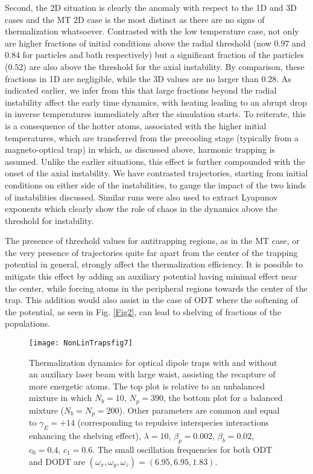 \documentclass[pra,letterpaper,onecolumn,superscriptaddress,floatfix]{revtex4}
\begin{document}
Second, the 2D situation is clearly the anomaly with respect to the 1D and 3D cases and the MT 2D case is 
the most distinct as there are no signs of thermalization whatsoever. Contrasted with the low temperature
case, not only are higher fractions of initial conditions above the radial threshold (now $0.97$ and $0.84$
for particles and bath respectively) but a significant fraction of the particles ($0.52$) are also above the
threshold for the axial instability. By comparison, these fractions in 1D are negligible, while the 3D values
are no larger than $0.28$. As indicated earlier, we infer from this that large fractions beyond the radial
instability affect the early time dynamics, with heating leading to an abrupt drop in inverse temperatures
immediately after the simulation starts. To reiterate, this is a consequence of the hotter atoms, associated
 with the higher initial temperatures, which are transferred from the precooling stage (typically from a magneto-optical
 trap) in which, as discussed above, harmonic trapping is assumed. Unlike the earlier situations, this effect is
 further compounded with the onset of the axial instability. We have contrasted trajectories, starting from initial
 conditions on either side of the instabilities, to gauge the impact of the two kinds of instabilities discussed.
 Similar runs were also used to extract Lyapunov exponents which clearly show the role of chaos in the dynamics above
the threshold for instability.

The presence of threshold values for antitrapping regions, as in the MT case, or the very presence of trajectories 
quite far apart from the center of the trapping potential in general,  strongly affect the thermalization efficiency. 
It is possible to mitigate this effect by adding an auxiliary potential having minimal effect near the center, while
forcing atoms in the peripheral regions towards the center of the trap. This addition would also assist in the case
of ODT where the softening of the potential, as seen in Fig. \ref{Fig2}, can lead to shelving of fractions of the populations. 

\begin{figure}[t]
\texttt{[image: NonLinTrapsfig7]}
\caption{Thermalization dynamics for optical dipole traps with and without an auxiliary laser beam with large 
waist, assisting the recapture of more energetic atoms. The top plot is relative to an unbalanced 
mixture in which $N_b=10$, $N_p=390$, the bottom plot for a balanced mixture ($N_b=N_p=200$). 
Other parameters are common and equal to $\gamma_E=+14$ (corresponding to repulsive interspecies 
interactions enhancing the shelving effect), $\lambda=10$, $\beta_p=0.002$, $\beta_b=0.02$, $c_0=0.4$, $c_1=0.6$. 
The small oscillation frequencies for both ODT and DODT are $(\omega_x, \omega_y, \omega_z)=(6.95,6.95,1.83)$.}
\label{Fig7}
\end{figure}
\end{document}
